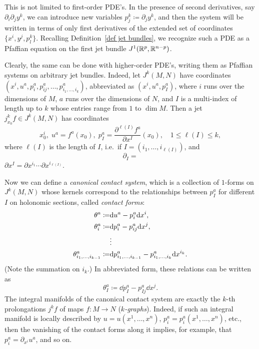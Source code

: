\begin{rem}
    This is not limited to first-order PDE's. In the presence of second derivatives, say $\partial_i\partial_j y^k$, we can  introduce new variables $p_j^k\coloneqq \partial_j y^k$, and then the system will be written in terms of only first derivatives of the extended set of coordinates $\{x^i,y^j,p^k_l\}$. Recalling Definition~\ref{def jet bundles}, we recognize such a PDE as a Pfaffian equation on the first jet bundle $J^1(\mathbb{R}^p,\mathbb{R}^{n-p})$. 
    
    Clearly, the same can be done with higher-order PDE's, writing them as Pfaffian systems on arbitrary jet bundles. Indeed, let $J^k(M,N)$ have coordinates $(x^i,u^a,p_i^a,p_{ij}^a,\ldots,p_{i_1,\ldots,i_k}^a)$, abbreviated as $(x^i,u^a,p_I^a)$, where $i$ runs over the dimensions of $M$, $a$ runs over the dimensions of $N$, and $I$ is a multi-index  of length up to $k$ whose entries range from $1$ to $\dim M$. Then a jet $j_{x_0}^k f\in J^k(M,N)$ has coordinates 
    \[x^i_0,\; u^a=f^a(x_0),\; p_I^a=\frac{\partial^{\ell(I)}f^a}{\partial x^I}(x_0),\quad 1\leq \ell(I)\leq k,\]
    where $\ell(I)$ is the length of $I$, i.e.\ if $I=(i_1,\ldots,i_{\ell(I)})$, and 
    \[\partial_I = \]
    $\partial x^I=\partial x^{i_1}\cdots \partial x^{i_{\ell(I)}}$.

    Now we can define a \emph{canonical contact system}, which is a collection of $1$-forms on $J^k(M,N)$ whose kernels correspond to the relationships between $p_I^a$ for different $I$ on holonomic sections, called \emph{contact forms}:
    \begin{align}
        \theta^a\coloneqq &{\mathrm{d}} u^a-p_i^a{\mathrm{d}} x^i,\notag\\
        \theta^a_i\coloneqq& {\mathrm{d}} p^a_i-p_{ij}^a{\mathrm{d}} x^j,\notag\\
        &\vdots \\
        \theta^a_{i_1,\ldots,i_{k-1}}\coloneqq &{\mathrm{d}} p^a_{i_1,\ldots,i_{k-1}}-p_{i_1,\ldots,i_k}^a{\mathrm{d}} x^{i_k}.\notag
    \end{align}
    (Note the summation on $i_k$.) In abbreviated form, these relations can be written as 
    \[\theta^a_I\coloneqq \dd p_I^a-p^a_{Ij}\dd x^j.\]
    The integral manifolds of the canonical contact system are exactly the $k$-th prolongations $j^k f$ of maps $f:M\to N$ (\emph{$k$-graphs}). Indeed, if such an integral manifold is locally described by $u=u(x^1,\ldots,x^n)$, $p_i^a=p_i^a(x^1,\ldots,x^n)$,  etc., then the vanishing of the contact forms along it implies, for example, that $p_i^a=\partial_{x^i}u^a$, and so on. 


\end{rem}
